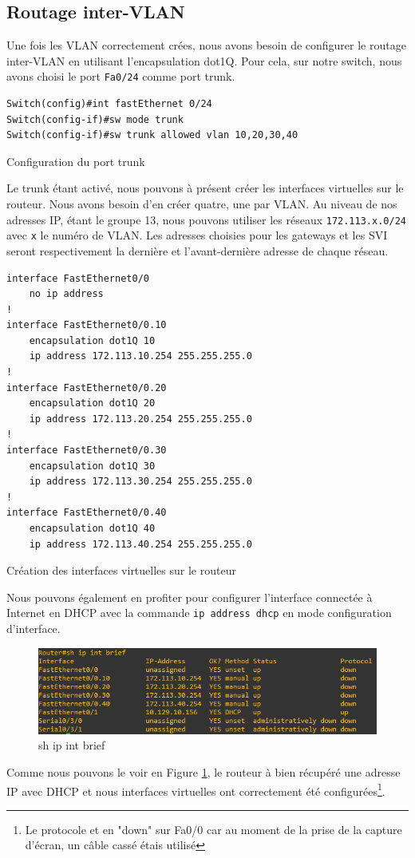 \documentclass{article}
\begin{document}
\subsection{Routage inter-VLAN}
Une fois les VLAN correctement crées, nous avons besoin de configurer le routage inter-VLAN en utilisant l'encapsulation dot1Q.
Pour cela, sur notre switch, nous avons choisi le port \verb|Fa0/24| comme port trunk.
\begin{listing}[H]
    \begin{verbatim}
Switch(config)#int fastEthernet 0/24
Switch(config-if)#sw mode trunk 
Switch(config-if)#sw trunk allowed vlan 10,20,30,40
    \end{verbatim}
    \caption{Configuration du port trunk}
    \label{reseau:switch:trunk}
\end{listing}
Le trunk étant activé, nous pouvons à présent créer les interfaces virtuelles sur le routeur. Nous avons besoin d'en créer quatre, une par VLAN. 
Au niveau de nos adresses IP, étant le groupe 13, nous pouvons utiliser les réseaux \verb|172.113.x.0/24| avec \verb|x| le numéro de VLAN. Les adresses choisies pour les gateways et les SVI seront respectivement la dernière et l'avant-dernière adresse de chaque réseau.
\begin{listing}[H]
    \begin{verbatim}
interface FastEthernet0/0
    no ip address
!
interface FastEthernet0/0.10
    encapsulation dot1Q 10
    ip address 172.113.10.254 255.255.255.0
!
interface FastEthernet0/0.20
    encapsulation dot1Q 20
    ip address 172.113.20.254 255.255.255.0
!
interface FastEthernet0/0.30
    encapsulation dot1Q 30
    ip address 172.113.30.254 255.255.255.0
!
interface FastEthernet0/0.40
    encapsulation dot1Q 40
    ip address 172.113.40.254 255.255.255.0
    \end{verbatim}
    \caption{Création des interfaces virtuelles sur le routeur}
    \label{router:sub-int}
\end{listing}
Nous pouvons également en profiter pour configurer l'interface connectée à Internet en DHCP avec la commande \verb|ip address dhcp| en mode configuration d'interface.
\begin{figure}[H]
    \includegraphics[width=\linewidth]{fig/router-dhcp.png}
    \caption{sh ip int brief}
    \label{router:shipintbrief}
\end{figure}
Comme nous pouvons le voir en Figure \ref{router:shipintbrief}, le routeur à bien récupéré une adresse IP avec DHCP et nous interfaces virtuelles ont correctement été configurées\footnote{Le protocole et en "down" sur Fa0/0 car au moment de la prise de la capture d'écran, un câble cassé étais utilisé}.
\newpage
\end{document}
